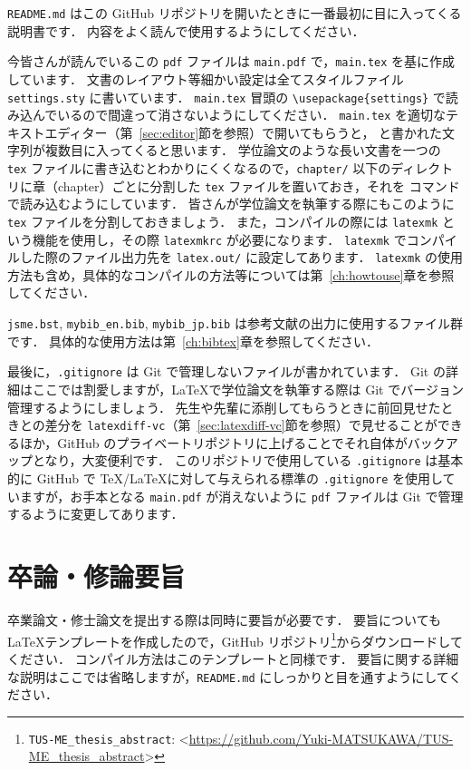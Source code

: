 \verb|README.md| はこの GitHub リポジトリを開いたときに一番最初に目に入ってくる説明書です．
内容をよく読んで使用するようにしてください．

今皆さんが読んでいるこの \verb|pdf| ファイルは \verb|main.pdf| で，\verb|main.tex| を基に作成しています．
文書のレイアウト等細かい設定は全てスタイルファイル \verb|settings.sty| に書いています．
\verb|main.tex| 冒頭の \verb|\usepackage{settings}| で読み込んでいるので間違って消さないようにしてください．
\verb|main.tex| を適切なテキストエディター（第~\ref{sec:editor}節を参照）で開いてもらうと，\verb|| と書かれた文字列が複数目に入ってくると思います．
学位論文のような長い文書を一つの \verb|tex| ファイルに書き込むとわかりにくくなるので，\verb|chapter/| 以下のディレクトリに章（chapter）ごとに分割した \verb|tex| ファイルを置いておき，それを \verb|| コマンドで読み込むようにしています．
皆さんが学位論文を執筆する際にもこのように \verb|tex| ファイルを分割しておきましょう．
また，コンパイルの際には \verb|latexmk| という機能を使用し，その際 \verb|latexmkrc| が必要になります．
\verb|latexmk| でコンパイルした際のファイル出力先を \verb|latex.out/| に設定してあります．
\verb|latexmk| の使用方法も含め，具体的なコンパイルの方法等については第~\ref{ch:howtouse}章を参照してください．

\verb|jsme.bst|, \verb|mybib_en.bib|, \verb|mybib_jp.bib| は参考文献の出力に使用するファイル群です．
具体的な使用方法は第~\ref{ch:bibtex}章を参照してください．

最後に，\verb|.gitignore| は Git で管理しないファイルが書かれています．
Git の詳細はここでは割愛しますが，\LaTeX で学位論文を執筆する際は Git でバージョン管理するようにしましょう．
先生や先輩に添削してもらうときに前回見せたときとの差分を \verb|latexdiff-vc|（第~\ref{sec:latexdiff-vc}節を参照）で見せることができるほか，GitHub のプライベートリポジトリに上げることでそれ自体がバックアップとなり，大変便利です．
このリポジトリで使用している \verb|.gitignore| は基本的に GitHub で \TeX/\LaTeX に対して与えられる標準の \verb|.gitignore| を使用していますが，お手本となる \verb|main.pdf| が消えないように \verb|pdf| ファイルは Git で管理するように変更してあります．

\section{卒論・修論要旨}
\label{sec:abstract}

卒業論文・修士論文を提出する際は同時に要旨が必要です．
要旨についても \LaTeX テンプレートを作成したので，GitHub リポジトリ\footnote{\texttt{TUS-ME\_thesis\_abstract}: \textless\url{https://github.com/Yuki-MATSUKAWA/TUS-ME_thesis_abstract}\textgreater}からダウンロードしてください．
コンパイル方法はこのテンプレートと同様です．
要旨に関する詳細な説明はここでは省略しますが，\verb|README.md| にしっかりと目を通すようにしてください．

